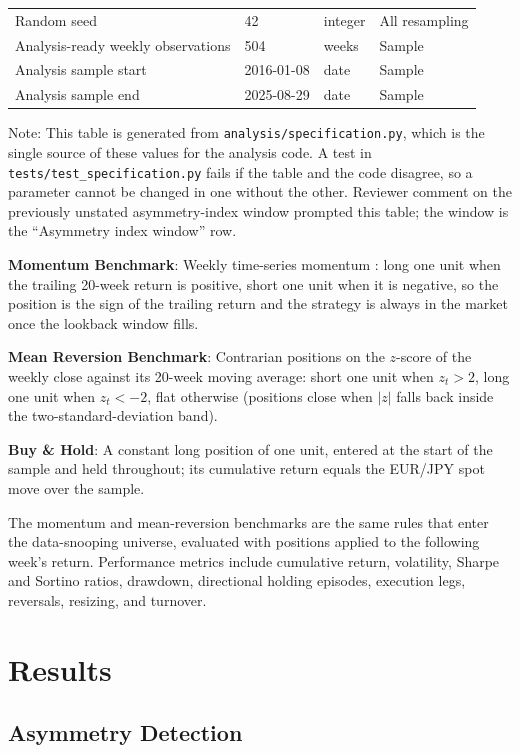 \documentclass[11pt]{article}
\begin{document}
\begin{table}[H]
\begin{tabular}{@{}llll@{}}
Random seed & 42 & integer & All resampling \\
Analysis-ready weekly observations & 504 & weeks & Sample \\
Analysis sample start & 2016-01-08 & date & Sample \\
Analysis sample end & 2025-08-29 & date & Sample \\
\bottomrule
\end{tabular}
\par\vspace{0.3em}
\parbox{\linewidth}{\footnotesize Note: This table is generated from \texttt{analysis/specification.py}, which is the single source of these values for the analysis code. A test in \texttt{tests/test\_specification.py} fails if the table and the code disagree, so a parameter cannot be changed in one without the other. Reviewer comment on the previously unstated asymmetry-index window prompted this table; the window is the ``Asymmetry index window'' row.}
\end{table}

\textbf{Momentum Benchmark}: Weekly time-series momentum \citep{moskowitz2012time}: long one unit when the trailing 20-week return is positive, short one unit when it is negative, so the position is the sign of the trailing return and the strategy is always in the market once the lookback window fills.

\textbf{Mean Reversion Benchmark}: Contrarian positions on the $z$-score of the weekly close against its 20-week moving average: short one unit when $z_t > 2$, long one unit when $z_t < -2$, flat otherwise (positions close when $|z|$ falls back inside the two-standard-deviation band).

\textbf{Buy \& Hold}: A constant long position of one unit, entered at the start of the sample and held throughout; its cumulative return equals the EUR/JPY spot move over the sample.

The momentum and mean-reversion benchmarks are the same rules that enter the data-snooping universe, evaluated with positions applied to the following week's return. Performance metrics include cumulative return, volatility, Sharpe and Sortino ratios, drawdown, directional holding episodes, execution legs, reversals, resizing, and turnover.

\section{Results}

\subsection{Asymmetry Detection}
\end{document}
